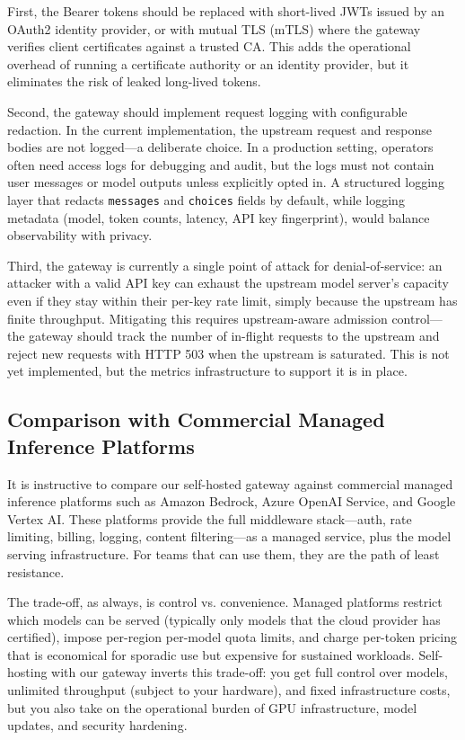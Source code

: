 \documentclass[10pt,journal]{IEEEtran}
\begin{document}
First, the Bearer tokens should be replaced with short-lived JWTs issued by an OAuth2 identity provider, or with mutual TLS (mTLS) where the gateway verifies client certificates against a trusted CA. This adds the operational overhead of running a certificate authority or an identity provider, but it eliminates the risk of leaked long-lived tokens.

Second, the gateway should implement request logging with configurable redaction. In the current implementation, the upstream request and response bodies are not logged---a deliberate choice. In a production setting, operators often need access logs for debugging and audit, but the logs must not contain user messages or model outputs unless explicitly opted in. A structured logging layer that redacts \texttt{messages} and \texttt{choices} fields by default, while logging metadata (model, token counts, latency, API key fingerprint), would balance observability with privacy.

Third, the gateway is currently a single point of attack for denial-of-service: an attacker with a valid API key can exhaust the upstream model server's capacity even if they stay within their per-key rate limit, simply because the upstream has finite throughput. Mitigating this requires upstream-aware admission control---the gateway should track the number of in-flight requests to the upstream and reject new requests with HTTP 503 when the upstream is saturated. This is not yet implemented, but the metrics infrastructure to support it is in place.

\subsection{Comparison with Commercial Managed Inference Platforms}

It is instructive to compare our self-hosted gateway against commercial managed inference platforms such as Amazon Bedrock, Azure OpenAI Service, and Google Vertex AI. These platforms provide the full middleware stack---auth, rate limiting, billing, logging, content filtering---as a managed service, plus the model serving infrastructure. For teams that can use them, they are the path of least resistance.

The trade-off, as always, is control vs. convenience. Managed platforms restrict which models can be served (typically only models that the cloud provider has certified), impose per-region per-model quota limits, and charge per-token pricing that is economical for sporadic use but expensive for sustained workloads. Self-hosting with our gateway inverts this trade-off: you get full control over models, unlimited throughput (subject to your hardware), and fixed infrastructure costs, but you also take on the operational burden of GPU infrastructure, model updates, and security hardening.
\end{document}
